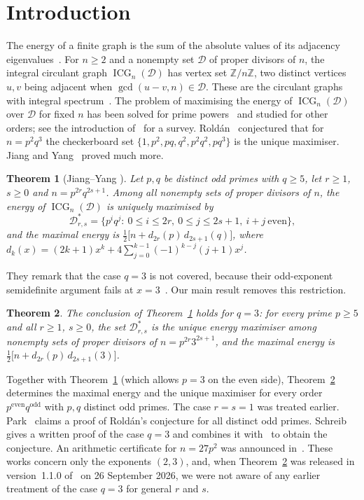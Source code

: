 \documentclass[11pt]{article}
\newtheorem{theorem}{Theorem}
\theoremstyle{remark}
\newcommand{\ICG}{\operatorname{ICG}}
\begin{document}
\section{Introduction}
The energy of a finite graph is the sum of the absolute values of its
adjacency eigenvalues~\cite{gutman}. For $n\ge2$ and a nonempty set
$\mathcal D$ of proper divisors of $n$, the integral circulant graph
$\ICG_n(\mathcal D)$ has vertex set $\mathbb Z/n\mathbb Z$, two distinct
vertices $u,v$ being adjacent when $\gcd(u-v,n)\in\mathcal D$. These are the
circulant graphs with integral spectrum~\cite{so}. The problem of maximising
the energy of $\ICG_n(\mathcal D)$ over $\mathcal D$ for fixed $n$ has been
solved for prime powers~\cite{sander2013} and studied for other orders; see
the introduction of~\cite{jy} for a survey. Rold\'an~\cite{roldan} conjectured
that for $n=p^2q^3$ the checkerboard set $\{1,p^2,pq,q^2,p^2q^2,pq^3\}$ is the
unique maximiser. Jiang and Yang~\cite{jy} proved much more.

\begin{theorem}[Jiang--Yang {\cite[Theorem~A]{jy}}]\label{thm:jy}
Let $p,q$ be distinct odd primes with $q\ge5$, let $r\ge1$, $s\ge0$ and
$n=p^{2r}q^{2s+1}$. Among all nonempty sets of proper divisors of $n$, the
energy of $\ICG_n(\mathcal D)$ is uniquely maximised by
\[
 \mathcal D^*_{r,s}=\{p^iq^j:\ 0\le i\le 2r,\ 0\le j\le 2s+1,\ i+j\ \text{even}\},
\]
and the maximal energy is $\tfrac12\bigl[n+d_{2r}(p)\,d_{2s+1}(q)\bigr]$, where
$d_k(x)=(2k+1)x^k+4\sum_{j=0}^{k-1}(-1)^{k-j}(j+1)x^j$.
\end{theorem}

They remark that the case $q=3$ is not covered, because their odd-exponent
semidefinite argument fails at $x=3$~\cite[Remark~4.2]{jy}. Our main result
removes this restriction.

\begin{theorem}\label{thm:main}
The conclusion of Theorem~\ref{thm:jy} holds for $q=3$: for every prime
$p\ge5$ and all $r\ge1$, $s\ge0$, the set $\mathcal D^*_{r,s}$ is the unique
energy maximiser among nonempty sets of proper divisors of $n=p^{2r}3^{2s+1}$,
and the maximal energy is $\tfrac12\bigl[n+d_{2r}(p)\,d_{2s+1}(3)\bigr]$.
\end{theorem}

Together with Theorem~\ref{thm:jy} (which allows $p=3$ on the even side),
Theorem~\ref{thm:main} determines the maximal energy and the unique maximiser
for every order $p^{\mathrm{even}}q^{\mathrm{odd}}$ with $p,q$ distinct odd
primes. The case $r=s=1$ was treated earlier. Park~\cite{park} claims a proof of
Rold\'an's conjecture for all distinct odd primes. Schreib~\cite{schreib}
gives a written proof of the case $q=3$ and combines it with~\cite{jy} to
obtain the conjecture.
An arithmetic certificate for $n=27p^2$ was announced in~\cite{tru}. These
works concern only the exponents $(2,3)$, and, when Theorem~\ref{thm:main} was
released in version~1.1.0 of~\cite{repo} on 26 September 2026, we were not aware
of any earlier treatment of the case $q=3$ for general $r$ and $s$.
\end{document}
